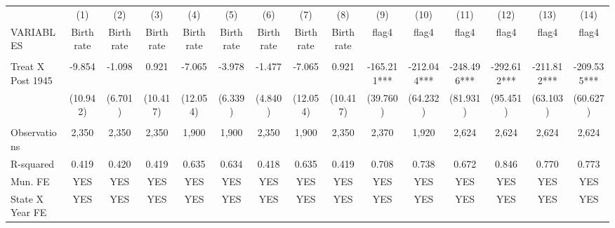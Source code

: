 \begin{tabular}{lcccccccccccccc} \hline
 & (1) & (2) & (3) & (4) & (5) & (6) & (7) & (8) & (9) & (10) & (11) & (12) & (13) & (14) \\
VARIABLES & Birth rate & Birth rate & Birth rate & Birth rate & Birth rate & Birth rate & Birth rate & Birth rate & flag4 & flag4 & flag4 & flag4 & flag4 & flag4 \\ \hline
 &  &  &  &  &  &  &  &  &  &  &  &  &  &  \\
Treat X Post 1945 & -9.854 & -1.098 & 0.921 & -7.065 & -3.978 & -1.477 & -7.065 & 0.921 & -165.211*** & -212.044*** & -248.496*** & -292.612*** & -211.812*** & -209.535*** \\
 & (10.942) & (6.701) & (10.417) & (12.054) & (6.339) & (4.840) & (12.054) & (10.417) & (39.760) & (64.232) & (81.931) & (95.451) & (63.103) & (60.627) \\
 &  &  &  &  &  &  &  &  &  &  &  &  &  &  \\
Observations & 2,350 & 2,350 & 2,350 & 1,900 & 1,900 & 2,350 & 1,900 & 2,350 & 2,370 & 1,920 & 2,624 & 2,624 & 2,624 & 2,624 \\
R-squared & 0.419 & 0.420 & 0.419 & 0.635 & 0.634 & 0.418 & 0.635 & 0.419 & 0.708 & 0.738 & 0.672 & 0.846 & 0.770 & 0.773 \\
Mun. FE & YES & YES & YES & YES & YES & YES & YES & YES & YES & YES & YES & YES & YES & YES \\
 State X Year FE & YES & YES & YES & YES & YES & YES & YES & YES & YES & YES & YES & YES & YES & YES \\ \hline
\end{tabular}
